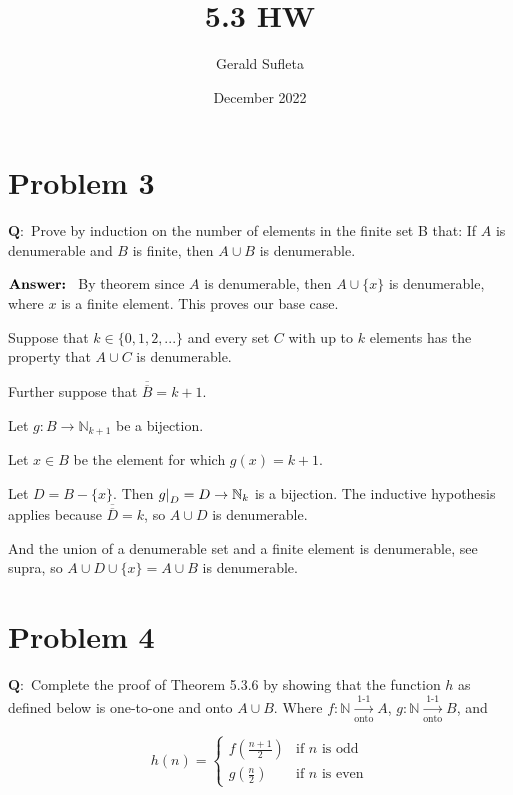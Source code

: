 \documentclass{article}
\title{5.3 HW}
\author{Gerald Sufleta}
\date{December 2022}
\newcommand{\OArrow}{\xrightarrow[\text{onto}]{\text{1-1}}}
\newcommand\restr[2]{{%
  \left.\kern-\nulldelimiterspace %
  #1 %
  \littletaller %
  \right|_{#2} %
  }}
\newcommand{\littletaller}{\mathchoice{\vphantom{\big|}}{}{}{}}
\begin{document}
\maketitle

\section{Problem 3}

$\mathbf{Q:}$ Prove  by induction on the number of elements in the finite set B that: If $A$ is denumerable and $B$ is finite, then $A \cup B$ is denumerable.

$\\ \textbf{Answer: }$ By theorem since $A$ is denumerable, then $A \cup \{x\}$ is denumerable, where $x$ is a finite element. This proves our base case.

Suppose that $k \in \{0,1,2,...\}$ and every set $C$ with up to $k$ elements has the property that $A \cup C$ is denumerable. 

Further suppose that $\overline{\overline{B}} = k + 1$. 

Let $g:B\rightarrow\mathbb{N}_{k+1}$ be a bijection.

Let $x \in B$ be the element for which $g(x) = k+1$.

Let $D = B - \{x\}$. Then $\restr{g}{D} = D \rightarrow \mathbb{N}_{k}$ is a bijection. The inductive hypothesis applies because $\overline{\overline{D}} = k$, so $A \cup D$ is denumerable. 

And the union of a denumerable set and a finite element is denumerable, see supra, so $A \cup D \cup \{x\} = A \cup B$ is denumerable.



\section{Problem 4}
$\mathbf{Q:}$ Complete the proof of Theorem 5.3.6 by showing that the function $h$ as defined below is one-to-one and onto $ A \cup B$. Where $f: \mathbb{N} \OArrow A$, $g: \mathbb{N} \OArrow B$, and 

\begin{equation}
h(n) = \begin{cases}
f(\frac{n+1}{2}) & \text{if } n \text{ is odd} \\
g(\frac{n}{2}) & \text{if } n \text{ is even}
\end{cases}
 \label{eq:h}
\end{equation}
\end{document}
